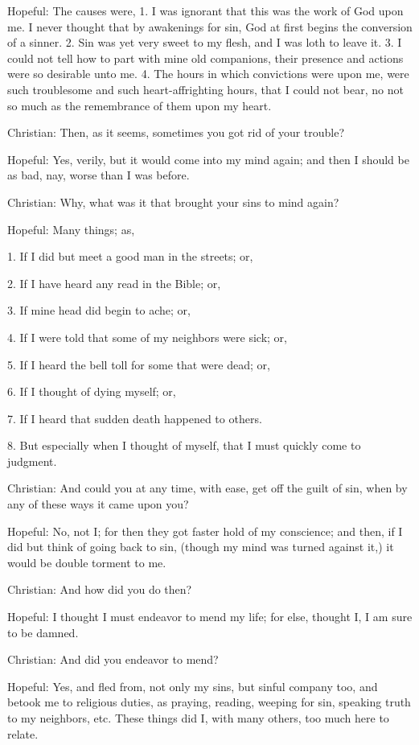 Hopeful: The causes were, 1. I was ignorant that this was the work of
God upon me. I never thought that by awakenings for sin, God at first
begins the conversion of a sinner. 2. Sin was yet very sweet to my
flesh, and I was loth to leave it. 3. I could not tell how to part with
mine old companions, their presence and actions were so desirable unto
me. 4. The hours in which convictions were upon me, were such
troublesome and such heart-affrighting hours, that I could not bear, no
not so much as the remembrance of them upon my heart.

Christian: Then, as it seems, sometimes you got rid of your trouble?

Hopeful: Yes, verily, but it would come into my mind again; and then I
should be as bad, nay, worse than I was before.

Christian: Why, what was it that brought your sins to mind again?

Hopeful: Many things; as,

1. If I did but meet a good man in the streets; or,

2. If I have heard any read in the Bible; or,

3. If mine head did begin to ache; or,

4. If I were told that some of my neighbors were sick; or,

5. If I heard the bell toll for some that were dead; or,

6. If I thought of dying myself; or,

7. If I heard that sudden death happened to others.

8. But especially when I thought of myself, that I must quickly come to
judgment.

Christian: And could you at any time, with ease, get off the guilt of
sin, when by any of these ways it came upon you?

Hopeful: No, not I; for then they got faster hold of my conscience; and
then, if I did but think of going back to sin, (though my mind was
turned against it,) it would be double torment to me.

Christian: And how did you do then?

Hopeful: I thought I must endeavor to mend my life; for else, thought
I, I am sure to be damned.

Christian: And did you endeavor to mend?

Hopeful: Yes, and fled from, not only my sins, but sinful company too,
and betook me to religious duties, as praying, reading, weeping for
sin, speaking truth to my neighbors, etc. These things did I, with many
others, too much here to relate.

